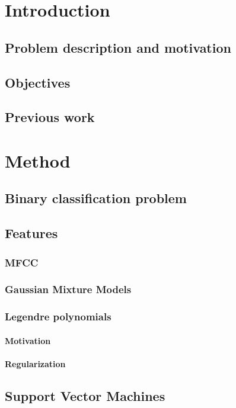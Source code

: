 \documentclass[11pt,a4paper]{tesis}
\begin{document}
\tableofcontents
\chapter{Introduction}
	\section{Problem description and motivation}
	\section{Objectives}
	\section{Previous work}
\chapter{Method}
	\section{Binary classification problem}
		
	\section{Features}
		\subsection{MFCC}
			
		\subsection{Gaussian Mixture Models}
			
		\subsection{Legendre polynomials}
			
			\subsubsection{Motivation}
				
			\subsubsection{Regularization}
				
	\section{Support Vector Machines}
		
\end{document}
